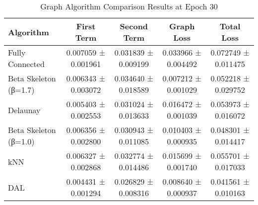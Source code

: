 \begin{table}
\caption{Graph Algorithm Comparison Results at Epoch 30}
\label{tab:graph_comparison}
\begin{tabular}{lcccc}
\toprule
Algorithm & First Term & Second Term & Graph Loss & Total Loss \\
\midrule
Fully Connected & 0.007059 ± 0.001961 & 0.031839 ± 0.009199 & 0.033966 ± 0.004492 & 0.072749 ± 0.011475 \\
Beta Skeleton (β=1.7) & 0.006343 ± 0.003072 & 0.034640 ± 0.018589 & 0.007212 ± 0.001029 & 0.052218 ± 0.029752 \\
Delaunay & 0.005403 ± 0.002553 & 0.031024 ± 0.013633 & 0.016472 ± 0.001039 & 0.053973 ± 0.016072 \\
Beta Skeleton (β=1.0) & 0.006356 ± 0.002800 & 0.030943 ± 0.011085 & 0.010403 ± 0.000935 & 0.048301 ± 0.014417 \\
kNN & 0.006327 ± 0.002868 & 0.032774 ± 0.014486 & 0.015699 ± 0.001740 & 0.055701 ± 0.017033 \\
DAL & 0.004431 ± 0.001294 & 0.026829 ± 0.008316 & 0.008640 ± 0.000937 & 0.041561 ± 0.010163 \\
\bottomrule
\end{tabular}
\end{table}
